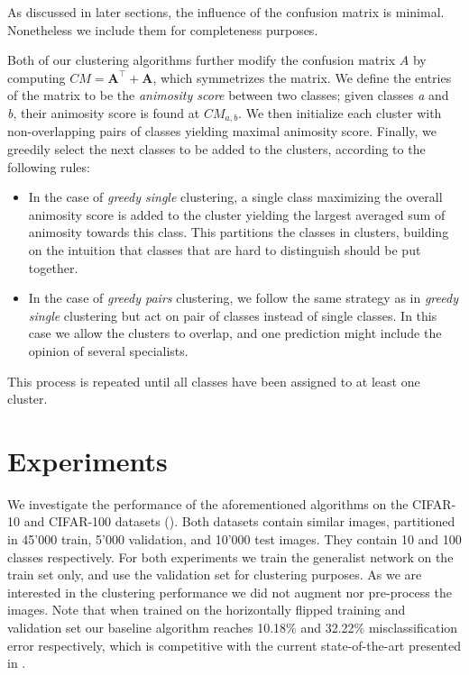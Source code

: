 \documentclass[12pt]{article}
\begin{document}
As discussed in later sections, the influence of the confusion matrix is
minimal. Nonetheless we include them for completeness purposes.

Both of our clustering algorithms further modify the confusion matrix
$A$ by computing $CM = \textbf{A}^\top + \textbf{A}$, which symmetrizes
the matrix. We define the entries of the matrix to be the
\emph{animosity score} between two classes; given classes \emph{a} and
\emph{b}, their animosity score is found at $CM_{a, b}$. We then
initialize each cluster with non-overlapping pairs of classes yielding
maximal animosity score. Finally, we greedily select the next classes to
be added to the clusters, according to the following rules:

\begin{itemize}
\item
  In the case of \emph{greedy single} clustering, a single class
  maximizing the overall animosity score is added to the cluster
  yielding the largest averaged sum of animosity towards this class.
  This partitions the classes in clusters, building on the intuition
  that classes that are hard to distinguish should be put together.
\item
  In the case of \emph{greedy pairs} clustering, we follow the same
  strategy as in \emph{greedy single} clustering but act on pair of
  classes instead of single classes. In this case we allow the clusters
  to overlap, and one prediction might include the opinion of several
  specialists.
\end{itemize}

This process is repeated until all classes have been assigned to at
least one cluster.

\section{Experiments}\label{experiments}

We investigate the performance of the aforementioned algorithms on the
CIFAR-10 and CIFAR-100 datasets (\cite{cifar}). Both datasets contain
similar images, partitioned in 45'000 train, 5'000 validation, and
10'000 test images. They contain 10 and 100 classes respectively. For
both experiments we train the generalist network on the train set only,
and use the validation set for clustering purposes. As we are interested
in the clustering performance we did not augment nor pre-process the
images. Note that when trained on the horizontally flipped training and
validation set our baseline algorithm reaches 10.18\% and 32.22\%
misclassification error respectively, which is competitive with the
current state-of-the-art presented in \cite{allcnn}.
\end{document}
